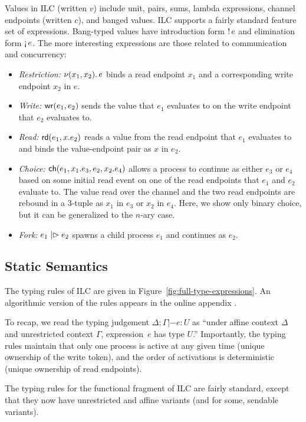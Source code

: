 Values in ILC (written $v$) include unit, pairs, sums, lambda expressions,
channel endpoints (written $c$), and banged values.  ILC
supports a fairly standard feature set of expressions. Bang-typed values have
introduction form ${!}\,{e}$ and elimination form $\textnormal{!`}\,{e}$. The more
interesting expressions are those related to communication and concurrency:
\begin{itemize}[leftmargin=*]
  \item \emph{Restriction:} $\nu(x_1, x_2).\,e$ binds a read endpoint $x_1$ and
    a corresponding write endpoint $x_2$ in $e$.
  \item \emph{Write:} $\textnormal{\textsf{wr}}\mathsf{(}{e_1},{e_2}\mathsf{)}$ sends the value that $e_1$ evaluates to on
    the write endpoint that $e_2$ evaluates to.
  \item \emph{Read:} $\textnormal{\textsf{rd}}\mathsf{(}{e_1},{x}.{e_2}\mathsf{)}$ reads a value from the read endpoint
    that $e_1$ evaluates to and binds the value-endpoint pair as $x$ in $e_2$.
  \item \emph{Choice:} $\textnormal{\textsf{ch}}\mathsf{(}{e_1},{x_1}.{e_3},{e_2},{x_2}.{e_4}\mathsf{)}$ allows a
    process to continue as either $e_3$ or $e_4$ based on some initial read
    event on one of the read endpoints that $e_1$ and $e_2$ evaluate to. The value read
    over the channel and the two read endpoints are rebound in a 3-tuple as $x_1$
    in $e_3$ or $x_2$ in $e_4$. Here, we show only binary choice, but it can be
    generalized to the $n$-ary case.
  \item \emph{Fork:} $e_1 \mathrel{|\rhd} e_2$ spawns a child process $e_1$ and
    continues as $e_2$.
\end{itemize}

\subsection{Static Semantics}
\label{subsec:types}

The typing rules of ILC are given in Figure~\ref{fig:full-type-expressions}. An
algorithmic version of the rules appears in the online appendix \todo{}.

To recap, we read the typing judgement $\Delta; \Gamma |- e : U$ as ``under affine context
$\Delta$ and unrestricted context $\Gamma$, expression~$e$ has type $U$.'' Importantly,
the typing rules maintain that only one process is active at any given time
(unique ownership of the write token), and the order of activations is
deterministic (unique ownership of read endpoints).

The typing rules for the functional fragment of ILC are fairly standard, except
that they now have unrestricted and affine variants (and for some, sendable
variants).

